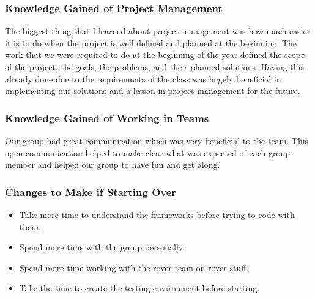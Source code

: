 \subsubsection{Knowledge Gained of Project Management}
The biggest thing that I learned about project management was how much easier it is to do when the project is well defined and planned at the beginning. 
The work that we were required to do at the beginning of the year defined the scope of the project, the goals, the problems, and their planned solutions. 
Having this already done due to the requirements of the class was hugely beneficial in implementing our solutions and a lesson in project management for the future.
\subsubsection{Knowledge Gained of Working in Teams}
Our group had great communication which was very beneficial to the team.
This open communication helped to make clear what was expected of each group member and helped our group to have fun and get along.
\subsubsection{Changes to Make if Starting Over}
\begin{itemize}
\item Take more time to understand the frameworks before trying to code with them.
\item Spend more time with the group personally.
\item Spend more time working with the rover team on rover stuff. 
\item Take the time to create the testing environment before starting.
\end{itemize}